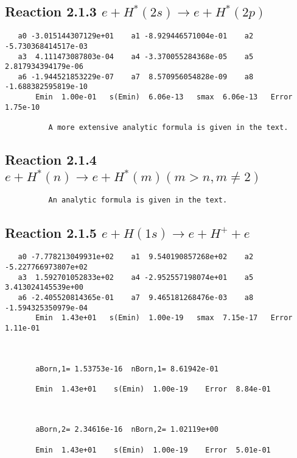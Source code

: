 \documentclass[12pt]{article}
\begin{document}
\newpage
\subsection{
Reaction 2.1.3 $   e + H^*(2s) \rightarrow e + H^*(2p)$}


\begin{small}\begin{verbatim}
   a0 -3.015144307129e+01    a1 -8.929446571004e-01    a2 -5.730368414517e-03
   a3  4.111473087803e-04    a4 -3.370055284368e-05    a5  2.817934394179e-06
   a6 -1.944521853229e-07    a7  8.570956054828e-09    a8 -1.688382595819e-10
       Emin  1.00e-01   s(Emin)  6.06e-13   smax  6.06e-13   Error  1.75e-10

          A more extensive analytic formula is given in the text.
\end{verbatim}\end{small}




\newpage
\subsection{
Reaction 2.1.4 $   e + H^*(n) \rightarrow e + H^*(m)  (m > n, m \neq 2)$}

\begin{small}\begin{verbatim}
          An analytic formula is given in the text.
\end{verbatim}\end{small}




\newpage
\subsection{
Reaction 2.1.5 $   e + H(1s) \rightarrow e + H^+ + e$}



\begin{small}\begin{verbatim}
   a0 -7.778213049931e+02    a1  9.540190857268e+02    a2 -5.227766973807e+02
   a3  1.592701052833e+02    a4 -2.952557198074e+01    a5  3.413024145539e+00
   a6 -2.405520814365e-01    a7  9.465181268476e-03    a8 -1.594325350979e-04
       Emin  1.43e+01   s(Emin)  1.00e-19   smax  7.15e-17   Error  1.11e-01



       aBorn,1= 1.53753e-16  nBorn,1= 8.61942e-01

       Emin  1.43e+01    s(Emin)  1.00e-19    Error  8.84e-01



       aBorn,2= 2.34616e-16  nBorn,2= 1.02119e+00

       Emin  1.43e+01    s(Emin)  1.00e-19    Error  5.01e-01
\end{verbatim}\end{small}
\end{document}

